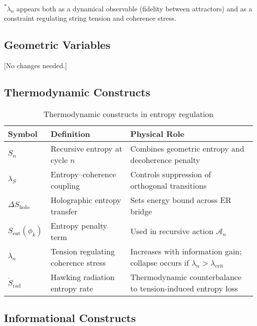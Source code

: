 \noindent\textsuperscript{*}\footnotesize{\( \lambda_n \) appears both as a dynamical observable (fidelity between attractors) and as a constraint regulating string tension and coherence stress.}

\subsection{Geometric Variables}
\label{subsec:geometry}

[No changes needed.]

\subsection{Thermodynamic Constructs}
\label{subsec:thermodynamic}

\begin{table}[H]
\centering
\begin{tabular}{>{\raggedright}p{3cm}>{\raggedright}p{7cm}>{\raggedright\arraybackslash}p{5cm}}
\toprule
\textbf{Symbol} & \textbf{Definition} & \textbf{Physical Role} \\
\midrule
\( S_n \) & Recursive entropy at cycle \( n \) & Combines geometric entropy and decoherence penalty \\
\addlinespace
\( \lambda_S \) & Entropy--coherence coupling & Controls suppression of orthogonal transitions \\
\addlinespace
\( \Delta S_{\text{holo}} \) & Holographic entropy transfer & Sets energy bound across ER bridge \\
\addlinespace
\( S_{\text{ent}}(\phi_k) \) & Entropy penalty term & Used in recursive action \(\mathcal{A}_n\) \\
\addlinespace
\( \lambda_n \) & Tension regulating coherence stress & Increases with information gain; collapse occurs if \( \lambda_n > \lambda_{\text{crit}} \) \\
\addlinespace
\( \dot{S}_{\text{rad}} \) & Hawking radiation entropy rate & Thermodynamic counterbalance to tension-induced entropy loss \\
\bottomrule
\end{tabular}
\caption{Thermodynamic constructs in entropy regulation}
\end{table}

\subsection{Informational Constructs}
\label{subsec:info-constructs}

